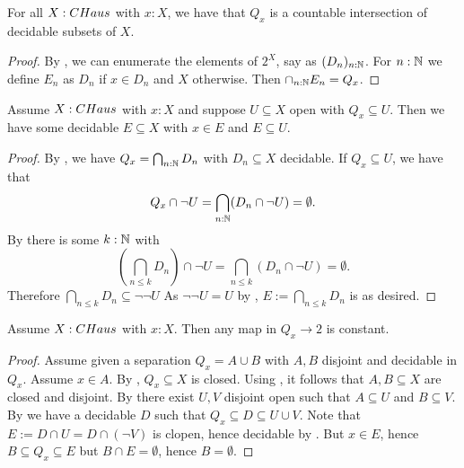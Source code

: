 \begin{lemma}\label{ConnectedComponentClosedInCompactHausdorff}
For all $X:\CHaus$ with $x:X$, we have that $Q_x$ is a countable intersection of decidable subsets of $X$.
\end{lemma}
\begin{proof}
  By ,
  we can enumerate the elements of $2^X$, say as $(D_n)_{n:\mathbb{N}}$. 
  For $n:\mathbb{N}$ we define $E_n$ as $D_n$ if $x\in D_n$ and $X$ otherwise. 
  Then $\cap_{n:\mathbb{N}}E_n = Q_x$.
\end{proof}

\begin{lemma}\label{ConnectedComponentSubOpenHasDecidableInbetween}
  Assume $X:\Chaus$ with $x:X$ and suppose $U\subseteq X$ open with $Q_x\subseteq U$. 
  Then we have some decidable $E\subseteq X$ with $x\in E$ and $E\subseteq U$. 
\end{lemma}
\begin{proof}
  By , 
  we have $Q_x = \bigcap_{n:\mathbb{N}}D_n$ with $D_n\subseteq X$ decidable. 
  If $Q_x \subseteq U$, we have that 
  $$Q_x\cap \neg U = \bigcap_{n:\mathbb{N}} (D_n \cap \neg U) = \emptyset.$$
  By  there is some $k:\mathbb{N}$ with 
  $$(\bigcap_{n\leq k} D_n )\cap \neg U  = \bigcap_{n\leq k} (D_n \cap \neg U) = \emptyset.$$
  Therefore $\bigcap_{n\leq k} D_n \subseteq \neg\neg U$ 
  As $\neg \neg U = U$ by , $E:= \bigcap_{n\leq k} D_n$ is as desired. 
\end{proof}

\begin{lemma}\label{ConnectedComponentConnected}
Assume $X:\Chaus$ with $x:X$. Then any map in $Q_x\to 2$ is constant.
\end{lemma}
\begin{proof}
Assume given a separation $Q_x = A\cup B$ with $A,B$ disjoint and decidable in $Q_x$. Assume $x\in A$. 
By , $Q_x\subseteq X$ is closed. 
Using , it follows that $A,B\subseteq X$ are closed and disjoint.
By  there exist $U,V$ disjoint open such that $A\subseteq U$ and $B\subseteq V$. 
By  we have a decidable $D$ such that $Q_x\subseteq D\subseteq U\cup V$. 
Note that $E := D\cap U = D \cap (\neg V)$ is clopen, hence decidable by .
But $x\in E$, hence $B\subseteq Q_x \subseteq E$ but $B \cap E = \emptyset$, hence $B=\emptyset$. 
\end{proof}


